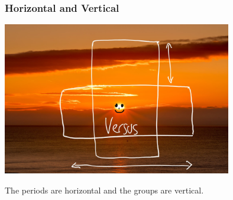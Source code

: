 \documentclass{beamer}
\begin{document}
\begin{frame}
    \frametitle{Horizontal and Vertical}
    \includegraphics[width=10cm]{../../../../public/images/hor_vert.jpg}

\onslide The periods are
\pause \alert{horizontal}
\onslide and the groups are 
\pause \alert{vertical}. 
\end{frame}
\end{document}
